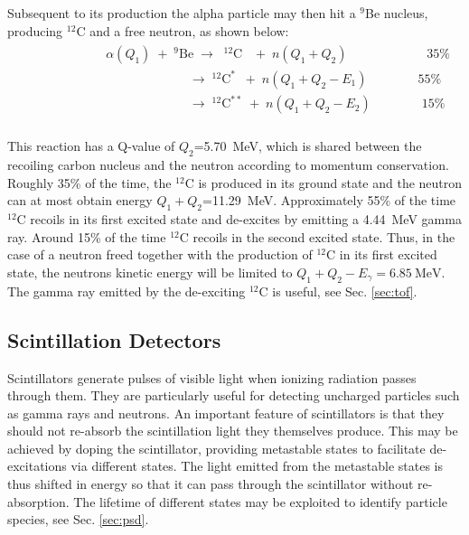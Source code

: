 \documentclass[main.tex]{subfiles}
\begin{document}
Subsequent to its production the alpha particle may then hit a $^{\textrm{9}}$Be nucleus, producing $^{12}$C and a free neutron, as shown below:
\begin{align}
	\begin{split}
		&\phantom{\qquad\qquad\qquad}\alpha(Q_1) \;+\; ^{9}\textrm{Be} \;\rightarrow\;\; ^{12}\textrm{C} \;\;\;+\; n(Q_1+Q_2)\qquad\qquad\qquad\; 35\%\\
		&\phantom{\qquad\qquad\qquad\qquad\qquad\qquad\;\;}\rightarrow\;^{12}\textrm{C}^* \;\;+\; n(Q_1+Q_2- E_1)\qquad \qquad 55\%\\
		&\phantom{\qquad\qquad\qquad\qquad\qquad\qquad\;\;}\rightarrow\;^{12}\textrm{C}^{**} \;+\; n(Q_1+Q_2- E_2)\qquad\qquad 15\%\\
	\label{eq:alphaBe}
	\end{split}
\end{align}

This reaction has a Q-value of $Q_2$=\SI{5.70}{\MeV}, which is shared between the recoiling carbon nucleus and the neutron according to momentum conservation. 
Roughly 35\% of the time, the $^{12}$C is produced in its ground state and the neutron can at most obtain energy $Q_1+Q_2$=\SI{11.29}{\MeV}. 
Approximately 55\% of the time $^{12}$C recoils in its first excited state and de-excites by emitting a \SI{4.44}{\MeV} gamma ray. 
Around 15\% of the time $^{12}$C recoils in the second excited state\citep{Scherzinger:2015}.
Thus, in the case of a neutron freed together with the production of $^{12}$C in its first excited state, the neutrons kinetic energy will be limited to $Q_1+Q_2-E_\gamma=\SI{6.85}{\MeV}$. The gamma ray emitted by the de-exciting $^{12}$C is useful, see Sec. \ref{sec:tof}.

	
\subsection{Scintillation Detectors}
Scintillators generate pulses of visible light when ionizing radiation passes through them. They are particularly useful for detecting uncharged particles such as gamma rays and neutrons. An important feature of scintillators is that they should not re-absorb the scintillation light they themselves produce. 
This may be achieved by doping the scintillator, providing metastable states to facilitate de-excitations via different states. 
The light emitted from the metastable states is thus shifted in energy so that it can pass through the scintillator without re-absorption. The lifetime of different states may be exploited to identify particle species, see Sec. \ref{sec:psd}.
\end{document}
